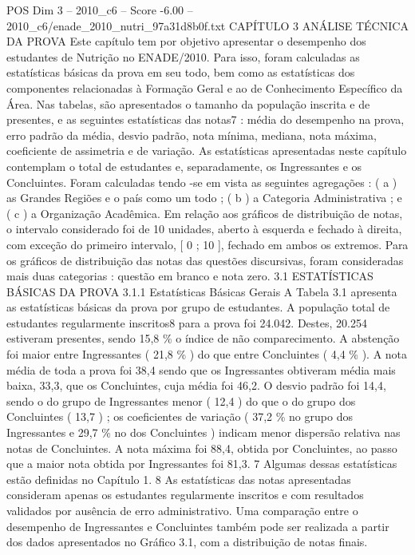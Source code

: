 \begin{textsample}{POS Dim 3 – 2010\_c6 – Score -6.00 – 2010\_c6/enade\_2010\_nutri\_97a31d8b0f.txt}  \label{ex:f3_pos_268}
CAPÍTULO 3 ANÁLISE TÉCNICA DA PROVA Este capítulo tem por objetivo apresentar o desempenho dos estudantes de Nutrição no ENADE/2010.
Para isso, foram calculadas as estatísticas básicas da prova em seu todo, bem como as estatísticas dos componentes relacionadas à Formação Geral e ao de Conhecimento Específico da Área.
Nas tabelas, são apresentados o tamanho da população inscrita e de presentes, e as seguintes estatísticas das notas7 : média do desempenho na prova, erro padrão da média, desvio padrão, nota mínima, mediana, nota máxima, coeficiente de assimetria e de variação.
As estatísticas apresentadas neste capítulo contemplam o total de estudantes e, separadamente, os Ingressantes e os Concluintes.
Foram calculadas tendo -se em vista as seguintes agregações : ( a ) as Grandes Regiões e o país como um todo ; ( b ) a Categoria Administrativa ; e ( c ) a Organização Acadêmica.
Em relação aos gráficos de distribuição de notas, o intervalo considerado foi de 10 unidades, aberto à esquerda e fechado à direita, com exceção do primeiro intervalo, [ 0 ; 10 ], fechado em ambos os extremos.
Para os gráficos de distribuição das notas das questões discursivas, foram consideradas mais duas categorias : questão em branco e nota zero. 3.1 ESTATÍSTICAS BÁSICAS DA PROVA 3.1.1 Estatísticas Básicas Gerais A Tabela 3.1 apresenta as estatísticas básicas da prova por grupo de estudantes.
A população total de estudantes regularmente inscritos8 para a prova foi 24.042.
Destes, 20.254 estiveram presentes, sendo 15,8 \% o índice de não comparecimento.
A abstenção foi maior entre Ingressantes ( 21,8 \% ) do que entre Concluintes ( 4,4 \% ).
A nota média de toda a prova foi 38,4 sendo que os Ingressantes obtiveram média mais baixa, 33,3, que os Concluintes, cuja média foi 46,2.
O desvio padrão foi 14,4, sendo o do grupo de Ingressantes menor ( 12,4 ) do que o do grupo dos Concluintes ( 13,7 ) ; os coeficientes de variação ( 37,2 \% no grupo dos Ingressantes e 29,7 \% no dos Concluintes ) indicam menor dispersão relativa nas notas de Concluintes.
A nota máxima foi 88,4, obtida por Concluintes, ao passo que a maior nota obtida por Ingressantes foi 81,3. 7 Algumas dessas estatísticas estão definidas no Capítulo 1. 8 As estatísticas das notas apresentadas consideram apenas os estudantes regularmente inscritos e com resultados validados por ausência de erro administrativo.
Uma comparação entre o desempenho de Ingressantes e Concluintes também pode ser realizada a partir dos dados apresentados no Gráfico 3.1, com a distribuição de notas finais.

\end{textsample}
